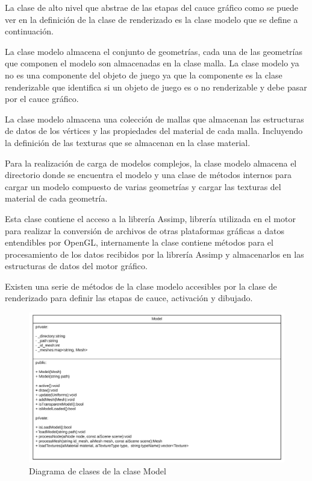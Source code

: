 \documentclass[a4paper, 17pt]{book}
\begin{document}
La clase de alto nivel que abstrae de las etapas del cauce gráfico como se puede ver en la definición de la clase de renderizado es
la clase modelo que se define a continuación.

\vspace{1mm} %

La clase modelo almacena el conjunto de geometrías, cada una de las geometrías que componen el modelo son almacenadas en la clase
malla. La clase modelo ya no es una componente del objeto de juego ya que la componente es la clase renderizable que identifica
si un objeto de juego es o no renderizable y debe pasar por el cauce gráfico. 

\vspace{1mm} %

La clase modelo almacena una colección de mallas que almacenan las estructuras de datos de los vértices y las propiedades del
material de cada malla. Incluyendo la definición de las texturas que se almacenan en la clase material.

\vspace{1mm} %

Para la realización de carga de modelos complejos, la clase modelo almacena el directorio donde se encuentra el modelo y una clase
de métodos internos para cargar un modelo compuesto de varias geometrías y cargar las texturas del material de cada geometría.

\vspace{1mm} %

Esta clase contiene el acceso a la librería Assimp, librería utilizada en el motor para realizar la conversión de archivos de otras
plataformas gráficas a datos entendibles por OpenGL, internamente la clase contiene métodos para el procesamiento de los datos
recibidos por la librería Assimp y almacenarlos en las estructuras de datos del motor gráfico. 

\vspace{1mm} %

Existen una serie de métodos de la clase modelo accesibles por la clase de renderizado para definir las etapas de cauce, activación
y dibujado.

\begin{figure}[H]
    \centering
    \includegraphics[scale=0.25, keepaspectratio]{img/Model.png}
    \caption{Diagrama de clases de la clase Model}
    \label{figura:Model}
\end{figure}
\end{document}
